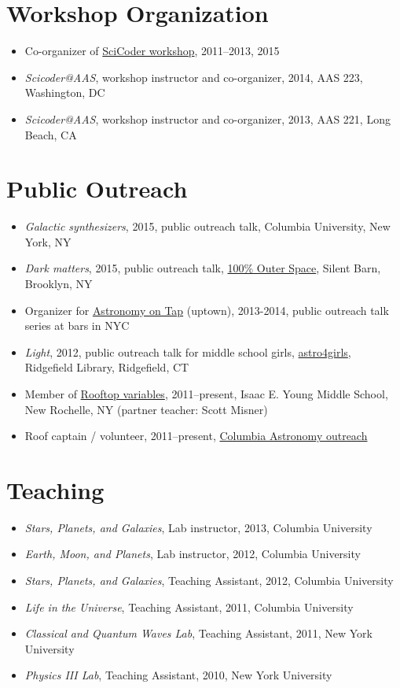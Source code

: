 \documentclass[12pt,letterpaper]{article}
\begin{document}
\section*{Workshop Organization}
\begin{itemize}
	\item Co-organizer of \href{http://scicoder.org}{SciCoder workshop}, 2011--2013, 2015
	\item \emph{Scicoder@AAS}, workshop instructor and co-organizer, 2014, AAS 223, Washington, DC
	\item \emph{Scicoder@AAS}, workshop instructor and co-organizer, 2013, AAS 221, Long Beach, CA
\end{itemize}

\section*{Public Outreach}

\begin{itemize}
	\item \emph{Galactic synthesizers}, 2015, public outreach talk, Columbia University, New York, NY
	\item \emph{Dark matters}, 2015, public outreach talk, \href{http://silentbarn.org/2015/03/100-outer-space-party}{100\% Outer Space}, Silent Barn, Brooklyn, NY
	\item Organizer for \href{http://astronomyontap.org/}{Astronomy on Tap} (uptown), 2013-2014, public outreach talk series at bars in NYC
	\item \emph{Light}, 2012, public outreach talk for middle school girls, \href{http://www.newstimes.com/news/article/Astronomer-Shoot-for-the-stars-3380793.php}{astro4girls}, Ridgefield Library, Ridgefield, CT
	\item Member of \href{http://rv.astro.columbia.edu}{Rooftop variables}, 2011--present, Isaac E. Young Middle School, New Rochelle, NY (partner teacher: Scott Misner)
	\item Roof captain / volunteer, 2011--present, \href{http://outreach.astro.columbia.edu/}{Columbia Astronomy outreach}

\end{itemize}

\section*{Teaching}
\begin{itemize}
	\item \emph{Stars, Planets, and Galaxies}, Lab instructor, 2013, Columbia University
	\item \emph{Earth, Moon, and Planets}, Lab instructor, 2012, Columbia University
	\item \emph{Stars, Planets, and Galaxies}, Teaching Assistant, 2012, Columbia University
	\item \emph{Life in the Universe}, Teaching Assistant, 2011, Columbia University
	\item \emph{Classical and Quantum Waves Lab}, Teaching Assistant, 2011, New York University
	\item \emph{Physics III Lab}, Teaching Assistant, 2010, New York University
\end{itemize}
\end{document}
